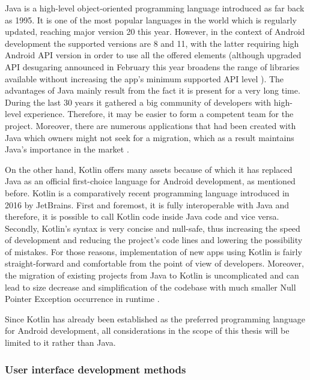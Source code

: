 Java is a high-level object-oriented programming language introduced as far back as 1995. It is one of the most popular languages in the world which is regularly updated, reaching major version 20 this year. However, in the context of Android development the supported versions are 8 and 11, with the latter requiring high Android API version in order to use all the offered elements (although upgraded API desugaring announced in February this year broadens the range of libraries available without increasing the app's minimum supported API level \cite{android_api_desugaring}). The advantages of Java mainly result from the fact it is present for a very long time. During the last 30 years it gathered a big community of developers with high-level experience. Therefore, it may be easier to form a competent team for the project. Moreover, there are numerous applications that had been created with Java which owners might not seek for a migration, which as a result maintains Java's importance in the market \cite{kc_kotlin_vs_java}.

On the other hand, Kotlin offers many assets because of which it has replaced Java as an official first-choice language for Android development, as mentioned before. Kotlin is a comparatively recent programming language introduced in 2016 by JetBrains. First and foremost, it is fully interoperable with Java and therefore, it is possible to call Kotlin code inside Java code and vice versa. Secondly, Kotlin's syntax is very concise and null-safe, thus increasing the speed of development and reducing the project's code lines and lowering the possibility of mistakes. For those reasons, implementation of new apps using Kotlin is fairly straight-forward and comfortable from the point of view of developers. Moreover, the migration of existing projects from Java to Kotlin is uncomplicated and can lead to size decrease and simplification of the codebase with much smaller Null Pointer Exception occurrence in runtime \cite{android_kotlin_first}.

Since Kotlin has already been established as the preferred programming language for Android development, all considerations in the scope of this thesis will be limited to it rather than Java.

\subsubsection*{User interface development methods}

